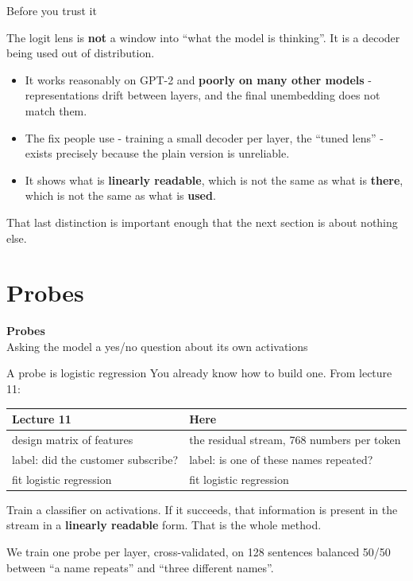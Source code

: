 \documentclass[aspectratio=169]{beamer}
\newcommand{\keybox}[1]{%
  \begin{tcolorbox}[colback=armblue!8, colframe=armblue, boxrule=0.6pt, arc=2pt]
  #1
  \end{tcolorbox}}
\newcommand{\trapbox}[1]{%
  \begin{tcolorbox}[colback=armred!8, colframe=armred, boxrule=0.6pt, arc=2pt]
  #1
  \end{tcolorbox}}
\newcommand{\sectiontransition}[2]{%
  \begin{frame}[plain]
    \vfill
    \begin{center}
      {\Huge\bfseries\color{popblue} #1}\\[1.1em]
      {\large #2}
    \end{center}
    \vfill
  \end{frame}}
\begin{document}
\begin{frame}{Before you trust it}
  \vspace{0.6em}
  \trapbox{The logit lens is \textbf{not} a window into ``what the model is thinking''. It is a
  decoder being used out of distribution.}

  \vspace{0.8em}
  \begin{itemize}
    \item It works reasonably on GPT-2 and \textbf{poorly on many other models} - representations
      drift between layers, and the final unembedding does not match them.
    \item The fix people use - training a small decoder per layer, the ``tuned lens'' - exists
      precisely because the plain version is unreliable.
    \item It shows what is \textbf{linearly readable}, which is not the same as what is
      \textbf{there}, which is not the same as what is \textbf{used}.
  \end{itemize}

  \vspace{0.7em}
  That last distinction is important enough that the next section is about nothing else.
\end{frame}

\section{Probes}
\sectiontransition{Probes}{Asking the model a yes/no question about its own activations}

\begin{frame}{A probe is logistic regression}
  \vspace{0.6em}
  You already know how to build one. From lecture 11:

  \vspace{0.5em}
  \begin{center}
  \small
  \begin{tabular}{@{}ll@{}}
    \toprule
    \textbf{Lecture 11} & \textbf{Here}\\
    \midrule
    design matrix of features & the residual stream, 768 numbers per token\\
    label: did the customer subscribe? & label: is one of these names repeated?\\
    fit logistic regression & fit logistic regression\\
    \bottomrule
  \end{tabular}
  \end{center}

  \vspace{0.8em}
  \keybox{Train a classifier on activations. If it succeeds, that information is present in the
  stream in a \textbf{linearly readable} form. That is the whole method.}

  \vspace{0.6em}
  We train one probe per layer, cross-validated, on 128 sentences balanced 50/50 between
  ``a name repeats'' and ``three different names''.
\end{frame}
\end{document}
